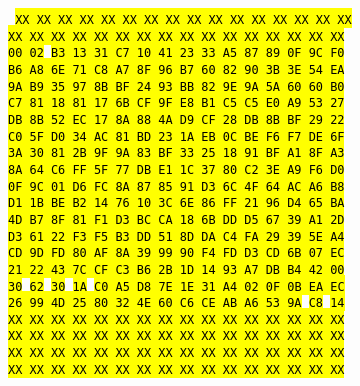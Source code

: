 \documentclass[journal]{IEEEtran}
\begin{document}
\begin{figure}[h]
  \begin{minipage}{.60\linewidth}
    \tiny{\texttt{\noindent
      \hl{XX XX XX XX XX XX XX XX XX XX XX XX XX XX XX XX\\
      XX XX XX XX XX XX XX XX XX XX XX XX XX XX XX XX}\\
      \hl{00 02 }\hl{B3 13 31 C7 10 41 23 33 A5 87 89 0F 9C F0\\
      B6 A8 6E 71 C8 A7 8F 96 B7 60 82 90 3B 3E 54 EA\\
      9A B9 35 97 8B BF 24 93 BB 82 9E 9A 5A 60 60 B0\\
      C7 81 18 81 17 6B CF 9F E8 B1 C5 C5 E0 A9 53 27\\
      DB 8B 52 EC 17 8A 88 4A D9 CF 28 DB 8B BF 29 22\\
      C0 5F D0 34 AC 81 BD 23 1A EB 0C BE F6 F7 DE 6F\\
      3A 30 81 2B 9F 9A 83 BF 33 25 18 91 BF A1 8F A3\\
      8A 64 C6 FF 5F 77 DB E1 1C 37 80 C2 3E A9 F6 D0\\
      0F 9C 01 D6 FC 8A 87 85 91 D3 6C 4F 64 AC A6 B8\\
      D1 1B BE B2 14 76 10 3C 6E 86 FF 21 96 D4 65 BA\\
      4D B7 8F 81 F1 D3 BC CA 18 6B DD D5 67 39 A1 2D\\
      D3 61 22 F3 F5 B3 DD 51 8D DA C4 FA 29 39 5E A4\\
      CD 9D FD 80 AF 8A 39 99 90 F4 FD D3 CD 6B 07 EC\\
      21 22 43 7C CF C3 B6 2B 1D 14 93 A7 DB B4 42 00}\\
      \hl{30 }\hl{62 }\hl{30 }\hl{1A }\hl{C0 A5 D8 7E 1E 31 A4 02 0F 0B EA EC\\
      26 99 4D 25 80 32 4E 60 C6 CE AB A6 53 9A }\hl{C8 }\hl{14}\\
      \hl{XX XX XX XX XX XX XX XX XX XX XX XX XX XX XX XX\\
      XX XX XX XX XX XX XX XX XX XX XX XX XX XX XX XX}\\
      \hl{XX XX XX XX XX XX XX XX XX XX XX XX XX XX XX XX\\
      XX XX XX XX XX XX XX XX XX XX XX XX XX XX XX XX}
    }}
  \end{minipage}%

\end{figure}
\end{document}
